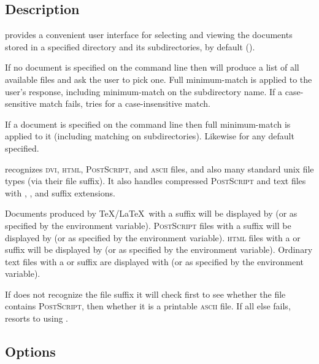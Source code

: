 \subsection*{Description}

 provides a convenient user interface for selecting and viewing the
documents stored in a specified directory and its subdirectories,
 by default ().

If no document is specified on the command line then  will produce a
list of all available files and ask the user to pick one.  Full minimum-match
is applied to the user's response, including minimum-match on the subdirectory
name.  If a case-sensitive match fails,  tries for a case-insensitive
match.

If a document is specified on the command line then full minimum-match is
applied to it (including matching on subdirectories).  Likewise for any
default specified.

 recognizes \textsc{dvi}, \textsc{html}, \textsc{PostScript}, and
\textsc{ascii} files, and also many standard unix file types (via their file
suffix).  It also handles compressed \textsc{PostScript} and text files with
, , and  suffix extensions.

Documents produced by \TeX/\LaTeX\ with a  suffix will be displayed
by  (or as specified by the  environment
variable).  \textsc{PostScript} files with a  suffix will be
displayed by  (or as specified by the 
environment variable).  \textsc{html} files with a  or 
suffix will be displayed by  (or as specified by the
 environment variable).  Ordinary text files with a
 or  suffix are displayed with  (or as
specified by the  environment variable).

If  does not recognize the file suffix it will check first to see
whether the file contains \textsc{PostScript}, then whether it is a printable
\textsc{ascii} file.  If all else fails,  resorts to using
.

\subsection*{Options}

